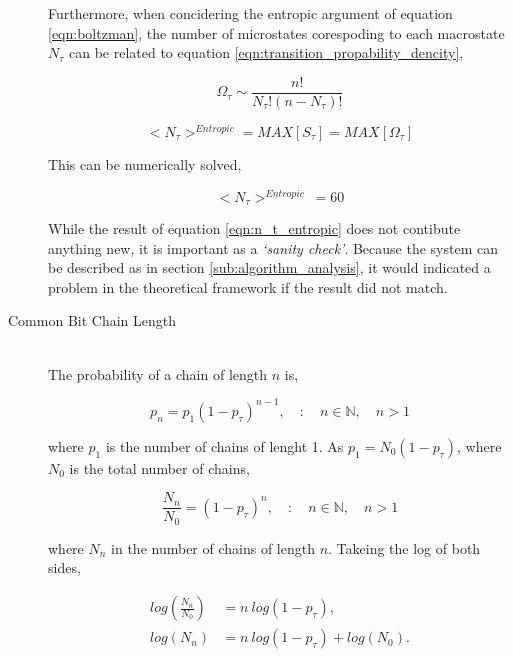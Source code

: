 \begin{description}
					Furthermore, when concidering the entropic argument of equation \ref{eqn:boltzman}, the number of microstates corespoding to each macrostate $N_\tau$ can be related to equation \ref{eqn:transition_propability_dencity},

					\begin{equation}
						\Omega_\tau \sim \frac{n!}{N_{\tau}!(n-N_{\tau})!}
					\end{equation}

					\begin{equation}
						<N_\tau>^{Entropic} = MAX[S_\tau] = MAX[\Omega_\tau]
					\end{equation}

					This can be numerically solved,

					\begin{equation}
						<N_\tau>^{Entropic}\ = 60
						\label{eqn:n_t_entropic}
					\end{equation}

					While the result of equation \ref{eqn:n_t_entropic} does not contibute anything new, it is important as a \textit{`sanity check'}.
					Because the system can be described as in section \ref{sub:algorithm_analysis}, it would indicated a problem in the theoretical framework if the result did not match.


				\item[Common Bit Chain Length] \hfill \\
					
					The probability of a chain of length $n$ is,

					\begin{equation}
						p_n = p_1(1 - p_\tau)^{n-1}, \quad : \quad n \in \mathbb{N}, \quad n > 1
					\end{equation}

					where $p_1$ is the number of chains of lenght 1. 
					As $p_1 = N_0 (1 -p_\tau)$, where $N_0$ is the total number of chains,

					\begin{equation}
						\frac{N_n}{N_0} = (1 - p_\tau)^n, \quad : \quad n \in \mathbb{N}, \quad n > 1
					\end{equation}

					where $N_n$ in the number of chains of length $n$.
					Takeing the log of both sides,

					\begin{align}
						log\left(\frac{N_n}{N_0}\right) &= n\ log(1 - p_\tau), \nonumber \\
 						log(N_n) &= n\  log(1 - p_\tau) + log(N_0).
 					\end{align}


\end{description}
